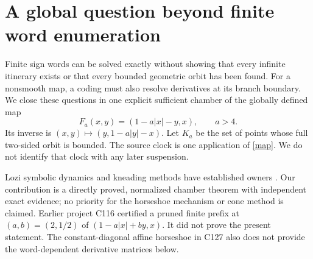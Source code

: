 \documentclass[10pt]{article}
\begin{document}
\section{A global question beyond finite word enumeration}
Finite sign words can be solved exactly without showing that every infinite
itinerary exists or that every bounded geometric orbit has been found.
For a nonsmooth map, a coding must also resolve derivatives at its branch
boundary. We close these questions in one explicit sufficient
chamber of the globally defined map
\begin{equation}\label{map}
 F_a(x,y)=(1-a|x|-y,x),\qquad a>4.
\end{equation}
Its inverse is $(x,y)\mapsto(y,1-a|y|-x)$. Let $K_a$ be the set of points
whose full two-sided orbit is bounded. The source clock is one application
of \eqref{map}. We do not identify that clock with any later suspension.

Lozi symbolic dynamics and kneading methods have established owners
\cite{misiurewicz,zheng}. Our contribution is a directly proved, normalized
chamber theorem with independent exact evidence; no priority for the
horseshoe mechanism or cone method is claimed. Earlier project C116
certified a pruned finite prefix at $(a,b)=(2,1/2)$ of
$(1-a|x|+by,x)$. It did not prove the present statement.
The constant-diagonal affine horseshoe in C127 also does not provide the
word-dependent derivative matrices below.
\end{document}
